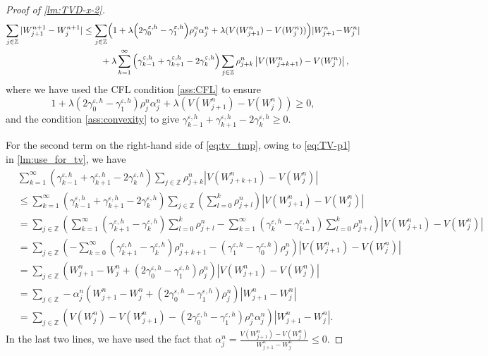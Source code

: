 \documentclass[10pt]{amsart}
\theoremstyle{plain}
\theoremstyle{definition}
\numberwithin{equation}{section}
\newcommand{\eps}{{\varepsilon}}
\begin{document}
\begin{proof}[Proof of \cref{lm:TVD-x-2}]
\begin{align}
    \sum_{j\in\mathbb{Z}} |W_{j+1}^{n+1} - W_j^{n+1}| &\leq \sum_{j\in\mathbb{Z}}\!\Big( 1 + \lambda \Big(2\gamma_0^{\eps,h}-\gamma_1^{\eps,h}\Big) \rho_j^n\alpha_j^n + \lambda(V(W_{j+1}^n)-V(W_j^n)) \Big) |W_{j+1}^n \!-\! W_j^n| \\
    &\qquad + \lambda \sum_{k=1}^\infty \Big(\gamma_{k-1}^{\eps,h}+\gamma_{k+1}^{\eps,h}-2\gamma_k^{\eps,h}\Big) \sum_{j\in\mathbb{Z}}\rho_{j+k}^n \left|V(W_{j+k+1}^n) -V(W_j^n)\right|, \notag
\end{align}
where we have used the CFL condition \cref{ass:CFL} to ensure 
\[ 
1 + \lambda \left(2\gamma_0^{\eps,h}-\gamma_1^{\eps,h}\right) \rho_j^n\alpha_j^n + \lambda\left(V(W_{j+1}^n)-V(W_j^n)\right)\geq0,
\] 
and the condition \cref{ass:convexity} to give $\gamma_{k-1}^{\eps,h}+\gamma_{k+1}^{\eps,h}-2\gamma_k^{\eps,h}\geq0$.

For the second term on the right-hand side of \cref{eq:tv_tmp}, owing to \cref{eq:TV-p1} in \cref{lm:use_for_tv}, we have 
\begin{align*}
    &\sum_{k=1}^\infty \left(\gamma_{k-1}^{\eps,h}+\gamma_{k+1}^{\eps,h}-2\gamma_k^{\eps,h}\right) \sum_{j\in\mathbb{Z}}\rho_{j+k}^n \left|V(W_{j+k+1}^n) -V(W_j^n)\right| \\
    &\leq \sum_{k=1}^\infty \left(\gamma_{k-1}^{\eps,h}+\gamma_{k+1}^{\eps,h}-2\gamma_k^{\eps,h}\right) \sum_{j\in\mathbb{Z}} \left(\sum_{l=0}^k \rho_{j+l}^n\right) \left|V(W_{j+1}^n) -V(W_j^n)\right| \\
    &= \sum_{j\in\mathbb{Z}} \left( \sum_{k=1}^\infty \left(\gamma_{k+1}^{\eps,h}-\gamma_k^{\eps,h}\right) \sum_{l=0}^k \rho_{j+l}^n - \sum_{k=1}^\infty \left(\gamma_k^{\eps,h}-\gamma_{k-1}^{\eps,h}\right) \sum_{l=0}^k \rho_{j+l}^n \right) \left|V(W_{j+1}^n) -V(W_j^n)\right| \\
    &= \sum_{j\in\mathbb{Z}} \left( -\sum_{k=0}^\infty \left(\gamma_{k+1}^{\eps,h}-\gamma_k^{\eps,h}\right) \rho_{j+k+1}^n - \left(\gamma_1^{\eps,h}-\gamma_0^{\eps,h}\right) \rho_j^n \right) \left|V(W_{j+1}^n) -V(W_j^n)\right| \\
    &= \sum_{j\in\mathbb{Z}} \left( W_{j+1}^n-W_j^n + \left(2\gamma_0^{\eps,h}-\gamma_1^{\eps,h}\right)\rho_j^n \right) \left|V(W_{j+1}^n)-V(W_j^n)\right| \\
    &= \sum_{j\in\mathbb{Z}} -\alpha_j^n \left( W_{j+1}^n-W_j^n+ \left(2\gamma_0^{\eps,h}-\gamma_1^{\eps,h}\right)\rho_j^n \right) \left|W_{j+1}^n-W_j^n\right| \\
    &= \sum_{j\in\mathbb{Z}} \left( V(W_j^n)-V(W_{j+1}^n) - \left(2\gamma_0^{\eps,h}-\gamma_1^{\eps,h}\right)\rho_j^n\alpha_j^n \right) |W_{j+1}^n-W_j^n|.
\end{align*}
In the last two lines, we have used the fact that $\alpha_j^n=\frac{V(W_{j+1}^n)-V(W_j^n)}{W_{j+1}^n-W_j^n}\leq0$.


\end{proof}
\end{document}

